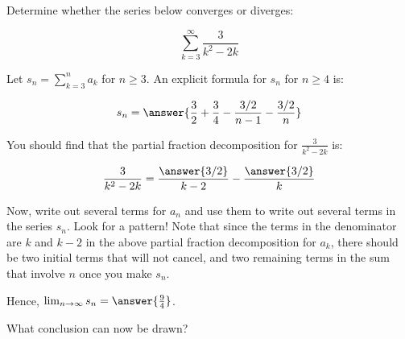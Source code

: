 \documentclass{ximera}
\author{Jim Talamo}
\begin{document}
\begin{exercise}
Determine whether the series below converges or diverges:

\[
\sum_{k=3}^{\infty} \frac{3}{k^2-2k}
\]

Let $s_n = \sum_{k=3}^{n} a_k$ for $n \geq3$. An explicit formula for $s_n$ for $n \geq 4 $ is:

\[
s_n = \answer{\frac{3}{2}+\frac{3}{4} - \frac{3/2}{n-1}-\frac{3/2}{n}}
\]

\begin{hint}
You should find that the partial fraction decomposition for $\frac{3}{k^2-2k}$ is:

\[
\frac{3}{k^2-2k} = \frac{\answer{3/2}}{k-2}-\frac{\answer{3/2}}{k}
\]

Now, write out several terms for $a_n$ and use them to write out several terms in the series $s_n$.  Look for a pattern!  Note that since the terms in the denominator are $k$ and $k-2$ in the above partial fraction decomposition for $a_k$, there should be two initial terms that will not cancel, and two remaining terms in the sum that involve $n$ once you make $s_n$.
\end{hint}

Hence, $\lim_{n \to \infty} s_n = \answer{\frac{9}{4}}$.

\begin{exercise}
What conclusion can now be drawn?

\begin{multipleChoice}
\end{multipleChoice}



\end{exercise}
\end{exercise}
\end{document}
